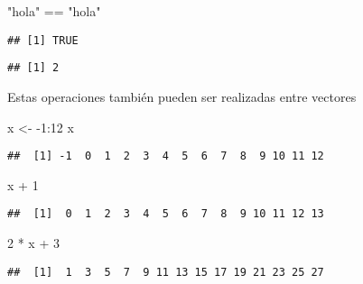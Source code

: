 \documentclass[]{article}
\newenvironment{Shaded}{\begin{snugshade}}{\end{snugshade}}
\newcommand{\DecValTok}[1]{\textcolor[rgb]{0.00,0.00,0.81}{{#1}}}
\newcommand{\StringTok}[1]{\textcolor[rgb]{0.31,0.60,0.02}{{#1}}}
\newcommand{\CommentTok}[1]{\textcolor[rgb]{0.56,0.35,0.01}{\textit{{#1}}}}
\newcommand{\NormalTok}[1]{{#1}}
\begin{document}
\begin{Shaded}
\begin{Highlighting}[]
\StringTok{"hola"} \NormalTok{==}\StringTok{ "hola"}
\end{Highlighting}
\end{Shaded}

\begin{verbatim}
## [1] TRUE
\end{verbatim}

\begin{Shaded}
\end{Shaded}

\begin{verbatim}
## [1] 2
\end{verbatim}

Estas operaciones también pueden ser realizadas entre vectores

\begin{Shaded}
\begin{Highlighting}[]
\NormalTok{x <-}\StringTok{ }\NormalTok{-}\DecValTok{1}\NormalTok{:}\DecValTok{12}
\NormalTok{x}
\end{Highlighting}
\end{Shaded}

\begin{verbatim}
##  [1] -1  0  1  2  3  4  5  6  7  8  9 10 11 12
\end{verbatim}

\begin{Shaded}
\begin{Highlighting}[]
\NormalTok{x +}\StringTok{ }\DecValTok{1}
\end{Highlighting}
\end{Shaded}

\begin{verbatim}
##  [1]  0  1  2  3  4  5  6  7  8  9 10 11 12 13
\end{verbatim}

\begin{Shaded}
\begin{Highlighting}[]
\DecValTok{2} \NormalTok{*}\StringTok{ }\NormalTok{x +}\StringTok{ }\DecValTok{3}
\end{Highlighting}
\end{Shaded}

\begin{verbatim}
##  [1]  1  3  5  7  9 11 13 15 17 19 21 23 25 27
\end{verbatim}
\end{document}
